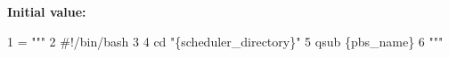 {\bfseries Initial value\+:}
\begin{DoxyCode}
1 =  \textcolor{stringliteral}{"""}
2 \textcolor{stringliteral}{#!/bin/bash}
3 \textcolor{stringliteral}{}
4 \textcolor{stringliteral}{cd "\{scheduler\_directory\}"}
5 \textcolor{stringliteral}{qsub \{pbs\_name\}}
6 \textcolor{stringliteral}{"""}
\end{DoxyCode}
